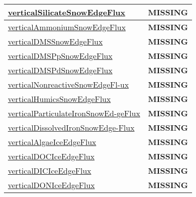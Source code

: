 {\begin{center}
\begin{longtable}{| p{2.0in} | p{4.0in} |}
    \hline
    \hyperref[subsec:var_sec_tracer_edge_fluxes_verticalSilicateSnowEdgeFlux]{verticalSilicateSnowEdgeFlux} & {\bf \color{red} MISSING} \\
    \hline
    \hyperref[subsec:var_sec_tracer_edge_fluxes_verticalAmmoniumSnowEdgeFlux]{verticalAmmoniumSnowEdgeFlux} & {\bf \color{red} MISSING} \\
    \hline
    \hyperref[subsec:var_sec_tracer_edge_fluxes_verticalDMSSnowEdgeFlux]{verticalDMSSnowEdgeFlux} & {\bf \color{red} MISSING} \\
    \hline
    \hyperref[subsec:var_sec_tracer_edge_fluxes_verticalDMSPpSnowEdgeFlux]{verticalDMSPpSnowEdgeFlux} & {\bf \color{red} MISSING} \\
    \hline
    \hyperref[subsec:var_sec_tracer_edge_fluxes_verticalDMSPdSnowEdgeFlux]{verticalDMSPdSnowEdgeFlux} & {\bf \color{red} MISSING} \\
    \hline
    \hyperref[subsec:var_sec_tracer_edge_fluxes_verticalNonreactiveSnowEdgeFlux]{verticalNonreactiveSnowEdgeFl-}\hyperref[subsec:var_sec_tracer_edge_fluxes_verticalNonreactiveSnowEdgeFlux]{ux  }& {\bf \color{red} MISSING} \\
    \hline
    \hyperref[subsec:var_sec_tracer_edge_fluxes_verticalHumicsSnowEdgeFlux]{verticalHumicsSnowEdgeFlux} & {\bf \color{red} MISSING} \\
    \hline
    \hyperref[subsec:var_sec_tracer_edge_fluxes_verticalParticulateIronSnowEdgeFlux]{verticalParticulateIronSnowEd-}\hyperref[subsec:var_sec_tracer_edge_fluxes_verticalParticulateIronSnowEdgeFlux]{geFlux  }& {\bf \color{red} MISSING} \\
    \hline
    \hyperref[subsec:var_sec_tracer_edge_fluxes_verticalDissolvedIronSnowEdgeFlux]{verticalDissolvedIronSnowEdge-}\hyperref[subsec:var_sec_tracer_edge_fluxes_verticalDissolvedIronSnowEdgeFlux]{Flux  }& {\bf \color{red} MISSING} \\
    \hline
    \hyperref[subsec:var_sec_tracer_edge_fluxes_verticalAlgaeIceEdgeFlux]{verticalAlgaeIceEdgeFlux} & {\bf \color{red} MISSING} \\
    \hline
    \hyperref[subsec:var_sec_tracer_edge_fluxes_verticalDOCIceEdgeFlux]{verticalDOCIceEdgeFlux} & {\bf \color{red} MISSING} \\
    \hline
    \hyperref[subsec:var_sec_tracer_edge_fluxes_verticalDICIceEdgeFlux]{verticalDICIceEdgeFlux} & {\bf \color{red} MISSING} \\
    \hline
    \hyperref[subsec:var_sec_tracer_edge_fluxes_verticalDONIceEdgeFlux]{verticalDONIceEdgeFlux} & {\bf \color{red} MISSING} \\

\end{longtable}
\end{center}}
